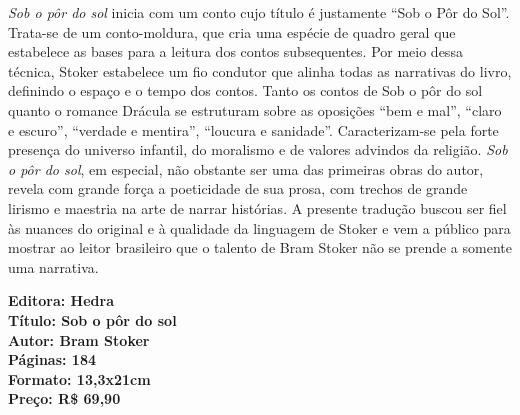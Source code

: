 \hspace*{-7cm}\hrulefill\hspace*{-7cm}

\medskip

\noindent{}\textit{Sob o pôr do sol} inicia com um conto cujo título é justamente ``Sob o Pôr do Sol''. Trata-se de um conto-moldura, que cria uma espécie de quadro geral que estabelece as bases para a leitura dos contos subsequentes. Por meio dessa técnica, Stoker estabelece um fio condutor que alinha todas as narrativas do livro, definindo o espaço e o tempo dos contos. Tanto os contos de Sob o pôr do sol quanto o romance Drácula se estruturam sobre as oposições ``bem e mal'', ``claro e escuro'', ``verdade e mentira'', ``loucura e sanidade''. Caracterizam-se pela forte presença do universo infantil, do moralismo e de valores advindos da religião. \textit{Sob o pôr do sol}, em especial, não obstante ser uma das primeiras obras do autor, revela com grande força a poeticidade de sua prosa, com trechos de grande lirismo e maestria na arte de narrar histórias. A presente tradução buscou ser fiel às nuances do original e à qualidade da linguagem de Stoker e vem a público para mostrar ao leitor brasileiro que o talento de Bram Stoker não se prende a somente uma narrativa.

\vfill

\noindent\begin{minipage}[c]{1\linewidth}
{\small\textbf{
\hspace*{-.1cm}Editora: Hedra\\
Título: Sob o pôr do sol\\
Autor: Bram Stoker\\ 
Páginas: 184\\
Formato: 13,3x21cm\\
Preço: R\$ 69,90\\
}}
\end{minipage}

\pagebreak


